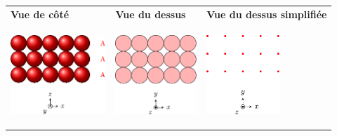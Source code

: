\documentclass[../../main/main.tex]{subfiles}
\begin{document}
\noindent
\begin{tabularx}{\linewidth}{YYY}
	\textbf{Vue de côté}
	 &
	\textbf{Vue du dessus}
	 &
	\textbf{Vue du dessus simplifiée}
	\\
	\begin{center}
		\includegraphics[height=3cm]{emp_AAA_1}
	\end{center}
	 &
	\begin{center}
		\includegraphics[height=3cm]{emp_AAA_2}
	\end{center}
	 &
	\begin{center}
		\includegraphics[height=3cm]{emp_AAA_3}
	\end{center}
\end{tabularx}
\end{document}
